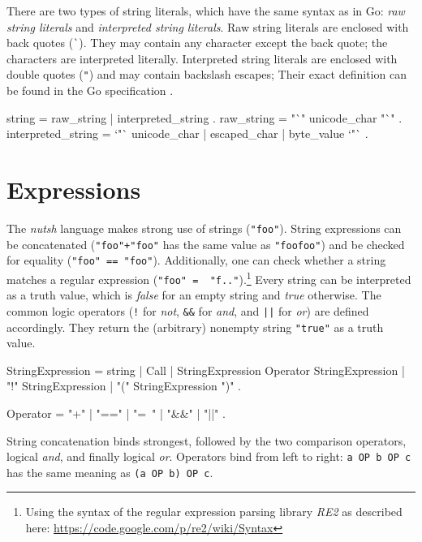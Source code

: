 \documentclass[paper=a4,twoside,abstract=on,cleardoublepage=empty,numbers=noenddot,toc=bib,12pt,appendixprefix=true]{scrreprt}
\begin{document}

There are two types of string literals, which have the same syntax as in Go: \emph{raw string literals} and \emph{interpreted string literals}. Raw string literals are enclosed with back quotes (\texttt{\`}). They may contain any character except the back quote; the characters are interpreted literally. Interpreted string literals are enclosed with double quotes (\texttt{"}) and may contain backslash escapes; Their exact definition can be found in the Go specification \cite{google13}. 

\begin{ebnf}
string = raw_string | interpreted_string .
raw_string = "`" { unicode_char } "`" .
interpreted_string = `"` { unicode_char | escaped_char |
    byte_value } `"` .
\end{ebnf}

\section{Expressions}


The \emph{nutsh} language makes strong use of strings (\texttt{"foo"}). String expressions can be concatenated (\texttt{"foo"+"foo"} has the same value as \texttt{"foofoo"}) and be checked for equality (\texttt{"foo" == "foo"}). Additionally, one can check whether a string matches a regular expression (\texttt{"foo" =~ "f.."}).\footnote{Using the syntax of the regular expression parsing library \emph{RE2} as described here: \url{https://code.google.com/p/re2/wiki/Syntax}} Every string can be interpreted as a truth value, which is \emph{false} for an empty string and \emph{true} otherwise. The common logic operators (\texttt{!} for \emph{not}, \texttt{\&\&} for \emph{and}, and \texttt{||} for \emph{or}) are defined accordingly. They return the (arbitrary) nonempty string \texttt{"true"} as a truth value.

\begin{ebnf}
StringExpression =
    string | Call | StringExpression Operator StringExpression |
    "!" StringExpression | "(" StringExpression ")" .

Operator = "+" | "==" | "=~" | "&&" | "||" .
\end{ebnf}


String concatenation binds strongest, followed by the two comparison operators, logical \emph{and}, and finally logical \emph{or}. Operators bind from left to right: \texttt{a OP b OP c} has the same meaning as \texttt{(a OP b) OP c}.
\end{document}
